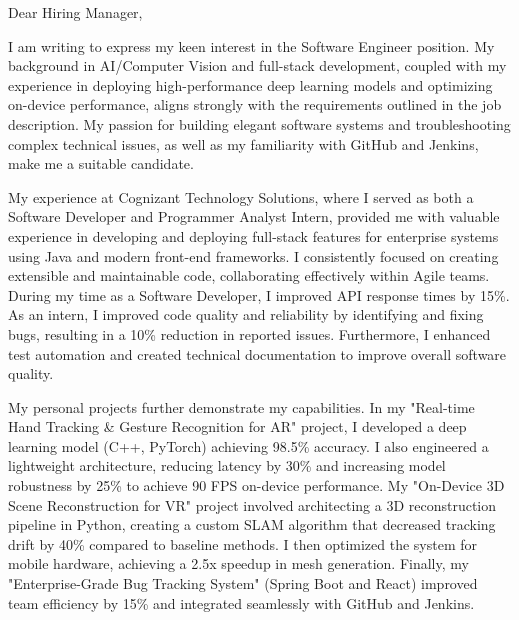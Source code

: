 \documentclass[letterpaper,11pt]{article}
\begin{document}
\begin{flushleft}
Dear Hiring Manager,

\vspace{12pt}

I am writing to express my keen interest in the Software Engineer position. My background in AI/Computer Vision and full-stack development, coupled with my experience in deploying high-performance deep learning models and optimizing on-device performance, aligns strongly with the requirements outlined in the job description.  My passion for building elegant software systems and troubleshooting complex technical issues, as well as my familiarity with GitHub and Jenkins, make me a suitable candidate.

\vspace{12pt}

My experience at Cognizant Technology Solutions, where I served as both a Software Developer and Programmer Analyst Intern, provided me with valuable experience in developing and deploying full-stack features for enterprise systems using Java and modern front-end frameworks.  I consistently focused on creating extensible and maintainable code, collaborating effectively within Agile teams. During my time as a Software Developer, I improved API response times by 15\%.  As an intern, I improved code quality and reliability by identifying and fixing bugs, resulting in a 10\% reduction in reported issues.  Furthermore, I enhanced test automation and created technical documentation to improve overall software quality.

\vspace{12pt}

My personal projects further demonstrate my capabilities.  In my "Real-time Hand Tracking & Gesture Recognition for AR" project, I developed a deep learning model (C++, PyTorch) achieving 98.5\% accuracy. I also engineered a lightweight architecture, reducing latency by 30\% and increasing model robustness by 25\% to achieve 90 FPS on-device performance. My "On-Device 3D Scene Reconstruction for VR" project involved architecting a 3D reconstruction pipeline in Python, creating a custom SLAM algorithm that decreased tracking drift by 40\% compared to baseline methods.  I then optimized the system for mobile hardware, achieving a 2.5x speedup in mesh generation.  Finally, my "Enterprise-Grade Bug Tracking System" (Spring Boot and React) improved team efficiency by 15\% and integrated seamlessly with GitHub and Jenkins.


\end{flushleft}
\end{document}
